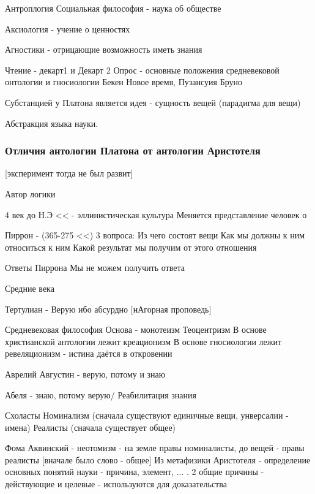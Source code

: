 \documentclass[a4paper,12pt]{report}
\begin{document}
	Антроплогия
	Социальная философия - наука об обществе

	Аксиология - учение о ценностях

	Агностики - отрицающие возможность иметь знания




Чтение - декарт1 и Декарт 2
Опрос - основные положения средневековой онтологии и гносиологии
	Бекен Новое время, 
	Пузансуия Бруно





	Субстанцией у Платона является идея - сущность вещей (парадигма для вещи)
	
	Абстракция языка науки.
	

	\subsubsection{Отличия антологии Платона от антологии Аристотеля}
	[эксперимент тогда не был развит]	
	
	Автор логики
	
	
	4 век до Н.Э << - эллинистическая культура	
	Меняется представление человек о 
	
	Пиррон - (365-275 <<)
	3 вопроса: 
		Из чего состоят вещи
		Как мы должны к ним относиться к ним
		Какой результат мы получим от этого отношения
	
	Ответы Пиррона
		Мы не можем получить ответа
		
		
		
Средние века

	Тертулиан - Верую ибо абсурдно
	[нАгорная проповедь]
	
	Средневековая философия
		Основа - монотеизм
		Теоцентризм
		В основе христианской антологии лежит креационизм
		В основе гносиологии лежит ревеляционизм - истина даётся в откровении
		
		
	Аврелий Августин -  верую, потому и знаю
	
	Абеля - знаю, потому  верую/ Реабилитация знания	
	
	Схоласты 
		Номинализм (сначала существуют единичные вещи, унверсалии -  имена)
		Реалисты (сначала существует общее)
		
	Фома Аквинский - неотомизм - на земле правы номиналисты, до вещей - правы реалисты [вначале было слово - общее]
	Из метафизики Аристотеля - определение основных понятий науки - причина, элемент, ... . 2 общие причины - действующие и целевые - используются для доказательства 
\end{document}
